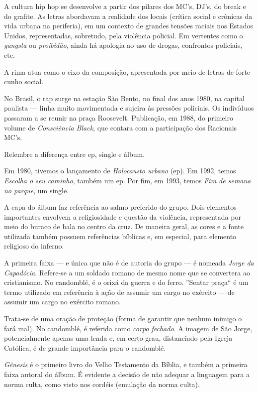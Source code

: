 A cultura hip hop se desenvolve a partir dos pilares dos MC's, DJ's, do break e do grafite. As letras abordavam a realidade dos locais (crítica social e crônicas da vida urbana na periferia), em um contexto de grandes tensões raciais nos Estados Unidos, representadas, sobretudo, pela violência policial. Em vertentes como o \textit{gangsta} ou \textit{proibidão}, ainda há apologia ao uso de drogas, confrontos policiais, etc.

A rima atua como o eixo da composição, apresentada por meio de letras de forte cunho social. 

No Brasil, o rap surge na estação São Bento, no final dos anos 1980, na capital paulista — linha muito movimentada e sujeira às pressões policiais. Os indivíduos passaram a se reunir na praça Roosevelt. Publicação, em 1988, do primeiro volume de \textit{Consciência Black}, que contara com a participação dos Racionais MC's.

Relembre a diferença entre ep, single e álbum.

Em 1980, tivemos o lançamento de \textit{Holocausto urbano} (ep). Em 1992, temos \textit{Escolha o seu caminho}, também um ep. Por fim, em 1993, temos \textit{Fim de semana no parque}, um single.

A capa do álbum faz referência ao salmo preferido do grupo. Dois elementos importantes envolvem a religiosidade e questão da violência, representada por meio do buraco de bala no centro da cruz. De maneira geral, as cores e a fonte utilizada também possuem referências bíblicas e, em especial, para elemento religioso do inferno.

A primeira faixa — e única que não é de autoria do grupo — é nomeada \textit{Jorge da Capadócia}. Refere-se a um soldado romano de mesmo nome que se convertera ao cristianismo. No candomblé, é o orixá da guerra e do ferro. ''Sentar praça`` é um termo utilizado em referência à ação de assumir um cargo no exército — de assumir um cargo no exército romano.

Trata-se de uma oração de proteção (forma de garantir que nenhum inimigo o fará mal). No candomblé, é referida como \textit{corpo fechado}. A imagem de São Jorge, potencialmente apenas uma lenda e, em certo grau, distanciado pela Igreja Católica, é de grande importância para o candomblé.

\textit{Gênesis} é o primeiro livro do Velho Testamento da Bíblia, e também a primeira faixa autoral do álbum. É evidente a decisão de não adequar a linguagem para a norma culta, como visto nos cordéis (emulação da norma culta).

